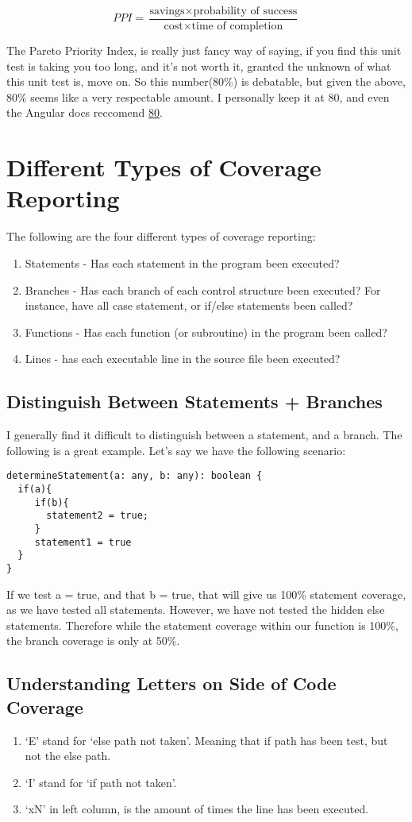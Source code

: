 \[
PPI = \frac{\text{savings} \times \text{probability of success}}
           {\text{cost} \times \text{time of completion}}
\]

The Pareto Priority Index, is really just fancy way of saying, if you find this
unit test is taking you too long, and it's not worth it, granted the unknown
of what this unit test is, move on. So this number(80\%) is debatable, but given
the above, 80\% seems like a very respectable amount. I personally keep it at
80, and even the Angular docs reccomend \href{https://github.com/angular/angular-cli/wiki/stories-code-coverage}{80}.

\section{ Different Types of Coverage Reporting }
The following are the four different types of coverage reporting:
\begin{enumerate}
  \item Statements - Has each statement in the program been executed?
  \item Branches - Has each branch of each control structure been executed? For
  instance, have all case statement, or if/else statements been called?
  \item Functions - Has each function (or subroutine) in the program been called?
  \item Lines - has each executable line in the source file been executed?
\end{enumerate}

\subsection{Distinguish Between Statements + Branches}
I generally find it difficult to distinguish between a statement, and a
branch. The following is a great example. Let's say we have the following
scenario:
\begin{lstlisting}
determineStatement(a: any, b: any): boolean {
  if(a){
     if(b){
       statement2 = true;
     }
     statement1 = true
  }
}
\end{lstlisting}

If we test a = true, and that b = true, that will give us 100\% statement
coverage, as we have tested all statements. However, we have not tested the
hidden else statements. Therefore while the statement coverage within our
function is 100\%, the branch coverage is only at 50\%.

\subsection{Understanding Letters on Side of Code Coverage}
\begin{enumerate}
  \item `E' stand for `else path not taken'. Meaning that if path has been test,
  but not the else path.
  \item `I' stand for `if path not taken'.
  \item `xN' in left column, is the amount of times the line has been executed.
\end{enumerate}

